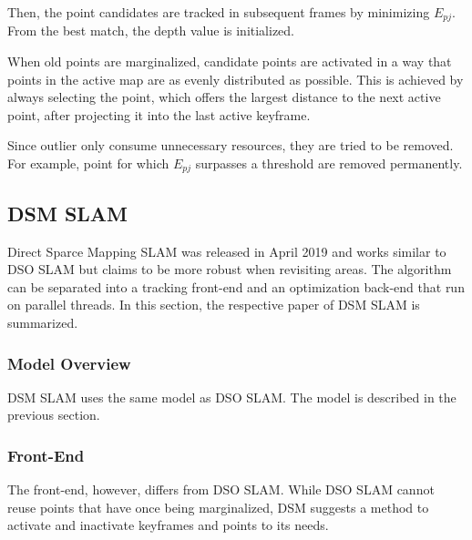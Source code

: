 \begin{enumerate}
	Then, the point candidates are tracked in subsequent frames by minimizing $E_{pj}$. From the best match, the depth value is initialized. 
	
	When old points are marginalized, candidate points are activated in a way that points in the active map are as evenly distributed 
	as possible. This is achieved by always selecting the point, which offers the largest distance to the next active point, after projecting
	it into the last active keyframe. 
	
	Since outlier only consume unnecessary resources, they are tried to be removed. For example, point for which $E_{pj}$ surpasses a threshold 
	are removed permanently. 
	
	\end{enumerate}

	\subsection{DSM SLAM}
	
	Direct Sparce Mapping SLAM was released in April 2019 and works similar to DSO SLAM but claims to be more robust when revisiting 
	areas. The algorithm can be separated into a tracking 
	front-end and an optimization back-end that run on parallel threads. 
	In this section, the respective paper of DSM SLAM \cite{dsm} is summarized. 
	
	\subsubsection{Model Overview}
	
		DSM SLAM uses the same model as DSO SLAM. The model is described in the previous section.
	
	\subsubsection{Front-End}
	
	The front-end, however, differs from DSO SLAM. While DSO SLAM cannot reuse points that have once being marginalized, DSM suggests a method 
	to activate and inactivate keyframes and points to its needs. 
	
